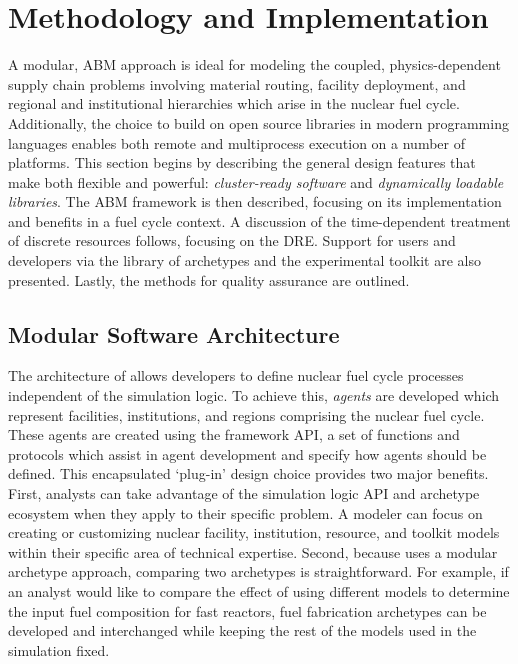 \section{Methodology and Implementation}

A modular, \acrfull{ABM} approach is ideal for modeling the coupled,
physics-dependent supply chain problems involving material routing, facility
deployment, and regional and institutional hierarchies which arise in the 
nuclear fuel cycle. Additionally, the choice
to build \Cyclus on open source libraries in modern programming languages
enables both remote and multiprocess execution on a number of platforms. This
section begins by describing the general design features that make \Cyclus both
flexible and powerful: \emph{cluster-ready software} and \emph{dynamically
loadable libraries}.  The
\gls{ABM} framework is then described, focusing on its implementation and benefits
in a fuel cycle context. A discussion of the
time-dependent treatment of discrete resources follows, focusing on the
\gls{DRE}. Support for users and developers via the \Cycamore library of
archetypes and the experimental toolkit are also presented.  Lastly, the methods
for quality assurance are outlined.

\subsection{Modular Software Architecture}

The architecture of \Cyclus allows developers to define nuclear fuel cycle
processes independent of the simulation logic. To achieve this, \emph{agents} are
developed which represent facilities, institutions, and regions comprising the
nuclear fuel cycle. These agents are created using the \Cyclus framework
\gls{API}, a set of functions and protocols which assist in agent development
and specify how agents should be defined.  This encapsulated `plug-in' design
choice provides two major benefits. First, analysts can take advantage of the
simulation logic \gls{API} and archetype ecosystem when they apply \Cyclus to
their specific problem.  A modeler can focus on creating or customizing
nuclear facility, institution, resource, and toolkit models within their
specific area of technical expertise. Second, because \Cyclus uses a modular
archetype approach, comparing two archetypes is straightforward. For example, if
an analyst would like to compare the effect of using different models to
determine the input fuel composition for fast reactors, fuel
fabrication archetypes can be developed and interchanged while keeping the rest
of the models used in the simulation fixed.

